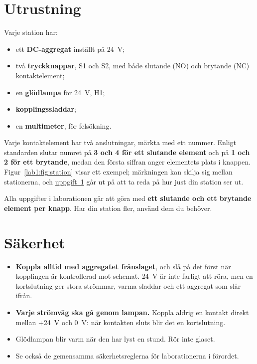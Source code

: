 \section{Utrustning}
\label{lab1:sec:equipment}
Varje station har:
\begin{itemize}
  \item ett \textbf{DC-aggregat} inställt på 24~V;
  \item två \textbf{tryckknappar}, S1 och S2, med både slutande (NO) och brytande (NC)
    kontaktelement;
  \item en \textbf{glödlampa} för 24~V, H1;
  \item \textbf{kopplingssladdar};
  \item en \textbf{multimeter}, för felsökning.
\end{itemize}

Varje kontaktelement har två anslutningar, märkta med ett nummer. Enligt standarden slutar numret
på \textbf{3 och 4 för ett slutande element} och på \textbf{1 och 2 för ett brytande}, medan den
första siffran anger elementets plats i knappen. Figur~\ref{lab1:fig:station} visar ett exempel;
märkningen kan skilja sig mellan stationerna, och \hyperref[lab1:u1]{uppgift~1} går ut på att ta
reda på hur just din station ser ut.


Alla uppgifter i laborationen går att göra med \textbf{ett slutande och ett brytande element per
knapp}. Har din station fler, använd dem du behöver.

\section{Säkerhet}
\label{lab1:sec:safety}
\begin{warning}
\begin{itemize}
  \item \textbf{Koppla alltid med aggregatet frånslaget}, och slå på det först när kopplingen är
    kontrollerad mot schemat. 24~V är inte farligt att röra, men en kortslutning ger stora
    strömmar, varma sladdar och ett aggregat som slår ifrån.
  \item \textbf{Varje strömväg ska gå genom lampan.} Koppla aldrig en kontakt direkt mellan
    +24~V och 0~V: när kontakten sluts blir det en kortslutning.
  \item Glödlampan blir varm när den har lyst en stund. Rör inte glaset.
  \item Se också de gemensamma säkerhetsreglerna för laborationerna i förordet.
\end{itemize}
\end{warning}

